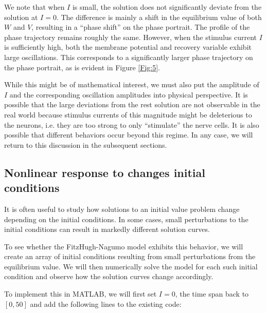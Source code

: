 \documentclass{book}
\theoremstyle{definition}
\begin{document}
We note that when $I$ is small, the solution does not significantly deviate from the solution at $I=0$. The difference is mainly a shift in the equilibrium value of both $W$ and $V$, resulting in a ``phase shift'' on the phase portrait. The profile of the phase trajectory remains roughly the same. However, when the stimulus current $I$ is sufficiently high, both the membrane potential and recovery variable exhibit large oscillations. This corresponds to a significantly larger phase trajectory on the phase portrait, as is evident in Figure \ref{Fig:5}. 

While this might be of mathematical interest, we must also put the amplitude of $I$ and the corresponding oscillation amplitudes into physical perspective. It is possible that the large deviations from the rest solution are not observable in the real world because stimulus currents of this magnitude might be deleterious to the neurons, i.e. they are too strong to only ``stimulate'' the nerve cells. It is also possible that different behaviors occur beyond this regime. In any case, we will return to this discussion in the subsequent sections.  



\subsection{Nonlinear response to changes initial conditions}


It is often useful to study how solutions to an initial value problem change depending on the initial conditions. In some cases, small perturbations to the initial conditions can result in markedly different solution curves. 

To see whether the FitzHugh-Nagumo model exhibits this behavior, we will create an array of initial conditions resulting from small perturbations from the equilibrium value. We will then numerically solve the model for each such initial condition and observe how the solution curves change accordingly. 

To implement this in MATLAB, we will first set $I=0$, the time span back to $[0,50]$ and add the following lines to the existing code:
\end{document}
